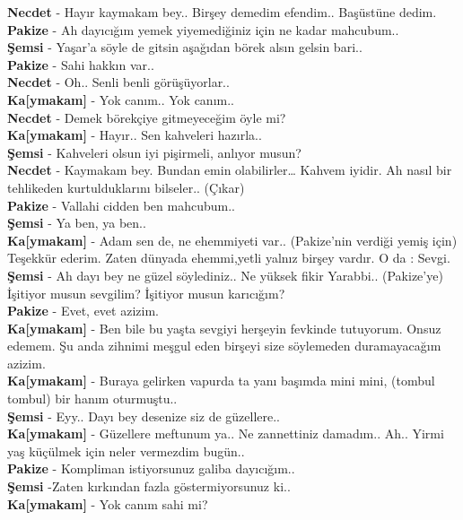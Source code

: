 \documentclass[]{book}
\begin{document}
\textbf{Necdet} - Hayır kaymakam bey.. Birşey demedim efendim.. Başüstüne dedim.\\
\textbf{Pakize} - Ah dayıcığım yemek yiyemediğiniz için ne kadar mahcubum..\\
\textbf{Şemsi} - Yaşar'a söyle de gitsin aşağıdan börek alsın gelsin bari..\\
\textbf{Pakize} - Sahi hakkın var..\\
\textbf{Necdet} - Oh.. Senli benli görüşüyorlar..\\
\textbf{Ka{[}ymakam{]}} - Yok canım.. Yok canım..\\
\textbf{Necdet} - Demek börekçiye gitmeyeceğim öyle mi?\\
\textbf{Ka{[}ymakam{]}} - Hayır.. Sen kahveleri hazırla..\\
\textbf{Şemsi} - Kahveleri olsun iyi pişirmeli, anlıyor musun?\\
\textbf{Necdet} - Kaymakam bey. Bundan emin olabilirler\ldots{} Kahvem iyidir. Ah nasıl bir tehlikeden kurtulduklarını bilseler.. (Çıkar)\\
\textbf{Pakize} - Vallahi cidden ben mahcubum..\\
\textbf{Şemsi} - Ya ben, ya ben..\\
\textbf{Ka{[}ymakam{]}} - Adam sen de, ne ehemmiyeti var.. (Pakize'nin verdiği yemiş için) Teşekkür ederim. Zaten dünyada ehemmi,yetli yalnız birşey vardır. O da : Sevgi.\\
\textbf{Şemsi} - Ah dayı bey ne güzel söylediniz.. Ne yüksek fikir Yarabbi.. (Pakize'ye) İşitiyor musun sevgilim? İşitiyor musun karıcığım?\\
\textbf{Pakize} - Evet, evet azizim.\\
\textbf{Ka{[}ymakam{]}} - Ben bile bu yaşta sevgiyi herşeyin fevkinde tutuyorum. Onsuz edemem. Şu anda zihnimi meşgul eden birşeyi size söylemeden duramayacağım azizim.\\
\textbf{Ka{[}ymakam{]}} - Buraya gelirken vapurda ta yanı başımda mini mini, (tombul tombul) bir hanım oturmuştu..\\
\textbf{Şemsi} - Eyy.. Dayı bey desenize siz de güzellere..\\
\textbf{Ka{[}ymakam{]}} - Güzellere meftunum ya.. Ne zannettiniz damadım.. Ah.. Yirmi yaş küçülmek için neler vermezdim bugün..\\
\textbf{Pakize} - Kompliman istiyorsunuz galiba dayıcığım..\\
\textbf{Şemsi} -Zaten kırkından fazla göstermiyorsunuz ki..\\
\textbf{Ka{[}ymakam{]}} - Yok canım sahi mi?\\
\end{document}
